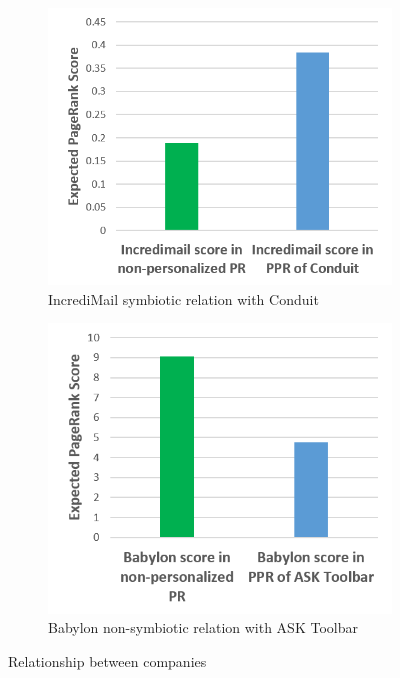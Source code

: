 \documentclass[11pt,oneside]{book}
\begin{document}
\begin{figure}[h]
\centering
\begin{subfigure}[b]{0.8\textwidth}
	\centering
\includegraphics[scale=0.8]{figures/incredi_sym_conduit.png}
\caption{IncrediMail symbiotic relation with Conduit}
\label{fig:incredi_sym_conduit}
\end{subfigure}
\begin{subfigure}[b]{0.8\textwidth}
	\centering
\includegraphics[scale=0.8]{figures/babylon_nosym_ask.png}
\caption{Babylon non-symbiotic relation with ASK Toolbar}
\label{fig:babylon_nosym_ask}
\end{subfigure}
\caption{Relationship between companies}
	\label{fig:symbiotic_pagerank}
\end{figure}
\end{document}
